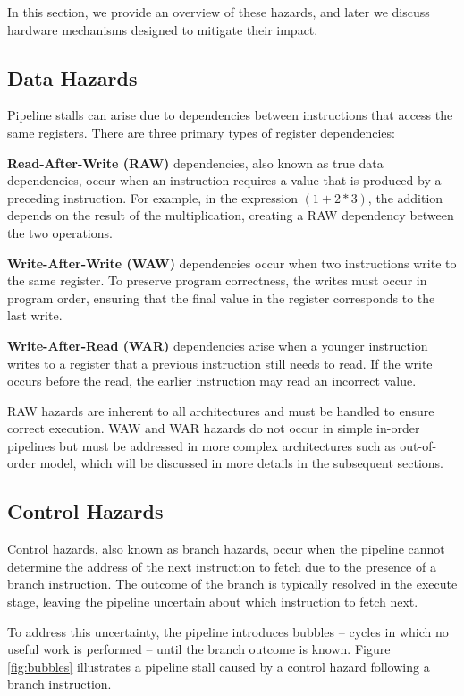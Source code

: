 In this section, we provide an overview of these hazards, and later we discuss hardware mechanisms designed to mitigate their impact.

\subsection{Data Hazards}

Pipeline stalls can arise due to dependencies between instructions that access the same registers. There are three primary types of register dependencies:

\textbf{Read-After-Write (RAW)} dependencies, also known as true data dependencies, occur when an instruction requires a value that is produced by a preceding instruction. For example, in the expression $(1 + 2 * 3)$, the addition depends on the result of the multiplication, creating a RAW dependency between the two operations.

\textbf{Write-After-Write (WAW)} dependencies occur when two instructions write to the same register. To preserve program correctness, the writes must occur in program order, ensuring that the final value in the register corresponds to the last write.

\textbf{Write-After-Read (WAR)} dependencies arise when a younger instruction writes to a register that a previous instruction still needs to read. If the write occurs before the read, the earlier instruction may read an incorrect value.

RAW hazards are inherent to all architectures and must be handled to ensure correct execution. WAW and WAR hazards do not occur in simple in-order pipelines but must be addressed in more complex architectures such as out-of-order model, which will be discussed in more details in the subsequent sections.

\subsection{Control Hazards}

Control hazards, also known as branch hazards, occur when the pipeline cannot determine the address of the next instruction to fetch due to the presence of a branch instruction. The outcome of the branch is typically resolved in the execute stage, leaving the pipeline uncertain about which instruction to fetch next.

To address this uncertainty, the pipeline introduces bubbles -- cycles in which no useful work is performed -- until the branch outcome is known. Figure \ref{fig:bubbles} illustrates a pipeline stall caused by a control hazard following a branch instruction.

